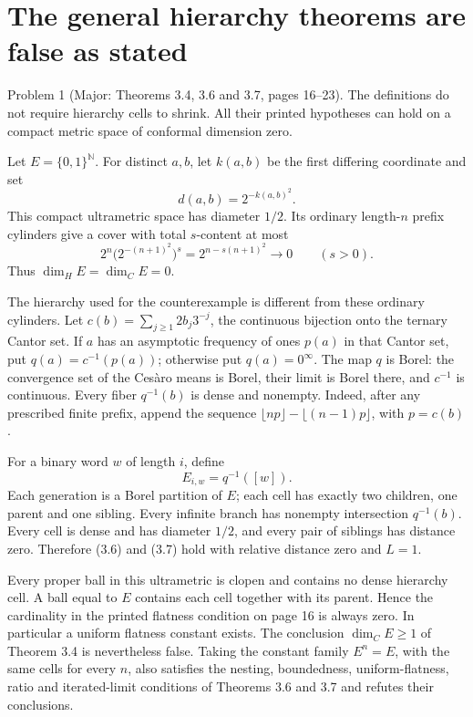 \documentclass[10pt]{article}
\begin{document}
\section*{The general hierarchy theorems are false as stated}
Problem 1 (Major: Theorems 3.4, 3.6 and 3.7, pages 16–23).  The definitions do not require hierarchy cells to shrink. All their printed hypotheses can hold on a compact metric space of conformal dimension zero.\par
Let \(E=\{0,1\}^{\mathbb N}\). For distinct \(a,b\), let \(k(a,b)\) be the first differing coordinate and set \[d(a,b)=2^{-k(a,b)^2}.\] This compact ultrametric space has diameter \(1/2\). Its ordinary length-\(n\) prefix cylinders give a cover with total \(s\)-content at most \[2^n\bigl(2^{-(n+1)^2}\bigr)^s
 =2^{n-s(n+1)^2}\longrightarrow0
 \qquad(s>0).\] Thus \(\dim_H E=\dim_C E=0\).\par
The hierarchy used for the counterexample is different from these ordinary cylinders. Let \(c(b)=\sum_{j\ge1}2b_j3^{-j}\), the continuous bijection onto the ternary Cantor set. If \(a\) has an asymptotic frequency of ones \(p(a)\) in that Cantor set, put \(q(a)=c^{-1}(p(a))\); otherwise put \(q(a)=0^\infty\). The map \(q\) is Borel: the convergence set of the Cesàro means is Borel, their limit is Borel there, and \(c^{-1}\) is continuous. Every fiber \(q^{-1}(b)\) is dense and nonempty. Indeed, after any prescribed finite prefix, append the sequence \(\lfloor np\rfloor-\lfloor(n-1)p\rfloor\), with \(p=c(b)\).\par
For a binary word \(w\) of length \(i\), define \[E_{i,w}=q^{-1}([w]).\] Each generation is a Borel partition of \(E\); each cell has exactly two children, one parent and one sibling. Every infinite branch has nonempty intersection \(q^{-1}(b)\). Every cell is dense and has diameter \(1/2\), and every pair of siblings has distance zero. Therefore (3.6) and (3.7) hold with relative distance zero and \(L=1\).\par
Every proper ball in this ultrametric is clopen and contains no dense hierarchy cell. A ball equal to \(E\) contains each cell together with its parent. Hence the cardinality in the printed flatness condition on page 16 is always zero. In particular a uniform flatness constant exists. The conclusion \(\dim_C E\ge1\) of Theorem 3.4 is nevertheless false. Taking the constant family \(E^n=E\), with the same cells for every \(n\), also satisfies the nesting, boundedness, uniform-flatness, ratio and iterated-limit conditions of Theorems 3.6 and 3.7 and refutes their conclusions.\par
\end{document}
